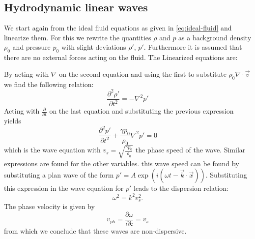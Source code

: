 \subsection{Hydrodynamic linear waves}
We start again from the ideal fluid equations as given in \autoref{eq:ideal-fluid} and linearize them.
For this we rewrite the quantities $\rho$ and $p$ as a background density $\rho_0$ and pressure $p_0$ with slight deviations $\rho'$, $p'$.
Furthermore it is assumed that there are no external forces acting on the fluid. The Linearized equations are:

{\centering 
\noindent {}
\par}
By acting with $\nabla$ on the second equation and using the first to substitute $\rho_0 \nabla \cdot \vec{v}$ we find the following relation:
\begin{equation*}
	\frac{\partial^2 \rho'}{\partial t^2} = -\nabla^2 p'
\end{equation*}
Acting with $ \frac{\partial}{\partial t}$ on the last equation and substituting the previous expression yields
\begin{equation*}
	\frac{\partial^2 p'}{\partial t^2} + \frac{\gamma p_0}{\rho_0} \nabla^2 p' = 0
\end{equation*}
which is the wave equation with $v_s = \sqrt{ \frac{\gamma p_0}{\rho_0} }$ the phase speed of the wave.
Similar expressions are found for the other variables. 
this wave speed can be found by substituting a plan wave of the form $p' = A \exp \left( i(\omega t - \vec{k}\cdot\vec{x}) \right) $. Substituting this expression in the wave equation for $p'$ leads to the dispersion relation:
\begin{equation}
	\omega^2 = k^2v_s^2.
\end{equation}
The phase velocity is given by
\begin{equation}
	v_{ph} = \frac{\partial \omega}{\partial k} = v_s
\end{equation}
from which we conclude that these waves are non-dispersive.

